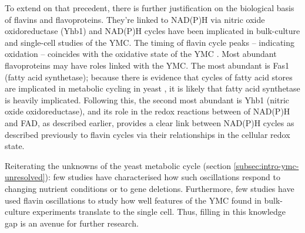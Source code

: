 To extend on that precedent, there is further justification on the biological basis of flavins and flavoproteins.
They're linked to NAD(P)H via nitric oxide oxidoreductase (Yhb1) and NAD(P)H cycles have been implicated in bulk-culture \citep{tuLogicYeastMetabolic2005} %
and single-cell \citep{papagiannakisAutonomousMetabolicOscillations2017} studies of the YMC.
The timing of flavin cycle peaks -- indicating oxidation -- coincides with the oxidative state of the YMC \citep{murrayRedoxRegulationRespiring2011}.
Most abundant flavoproteins may have roles linked with the YMC.
The most abundant is Fas1 (fatty acid synthetase); because there is evidence that cycles of fatty acid stores are implicated in metabolic cycling in yeast \citep{campbellBuildingBlocksAre2020}, it is likely that fatty acid synthetase is heavily implicated.
Following this, the second most abundant is Yhb1 (nitric oxide oxidoreductase), and its role in the redox reactions between of NAD(P)H and FAD, as described earlier, provides a clear link between NAD(P)H cycles as described previously to flavin cycles via their relationships in the cellular redox state.

Reiterating the unknowns of the yeast metabolic cycle (section \ref{subsec:intro-ymc-unresolved}):
few studies have characterised how such oscillations respond to changing nutrient conditions or to gene deletions.
Furthermore,
few studies have used flavin oscillations to study how well features of the YMC found in bulk-culture experiments translate to the single cell.
Thus, filling in this knowledge gap is an avenue for further research.



